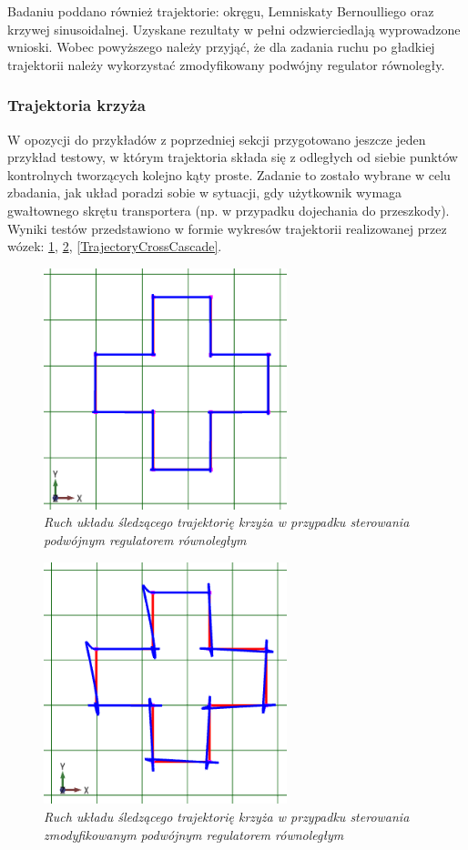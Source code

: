 \documentclass[12pt, oneside]{report}
\theoremstyle{definition}
\begin{document}
Badaniu poddano również trajektorie: okręgu, Lemniskaty Bernoulliego oraz krzywej sinusoidalnej. Uzyskane rezultaty w pełni odzwierciedlają wyprowadzone wnioski. Wobec powyższego należy przyjąć, że dla zadania ruchu po gładkiej trajektorii należy wykorzystać zmodyfikowany podwójny regulator równoległy.

\subsubsection{Trajektoria krzyża}
W opozycji do przykładów z poprzedniej sekcji przygotowano jeszcze jeden przykład testowy, w którym trajektoria składa się z odległych od siebie punktów kontrolnych tworzących kolejno kąty proste. Zadanie to zostało wybrane w celu zbadania, jak układ poradzi sobie w sytuacji, gdy użytkownik wymaga gwałtownego skrętu transportera (np. w przypadku dojechania do przeszkody). Wyniki testów przedstawiono w formie wykresów trajektorii realizowanej przez wózek: \ref{TrajectoryCrossParallel}, \ref{TrajectoryCrossPD}, \ref{TrajectoryCrossCascade}.

\begin{figure}[H]
	\centering
		\includegraphics[width = 200pt]{TrajectoryCrossParallel} 
		\caption{\textit{Ruch układu śledzącego trajektorię krzyża w przypadku sterowania podwójnym regulatorem równoległym}}
		\label{TrajectoryCrossParallel}
\end{figure}

\begin{figure}[H]
	\centering
		\includegraphics[width = 200pt]{TrajectoryCrossPD} 
		\caption{\textit{Ruch układu śledzącego trajektorię krzyża w przypadku sterowania zmodyfikowanym podwójnym regulatorem równoległym}}
		\label{TrajectoryCrossPD}
\end{figure}
\end{document}
